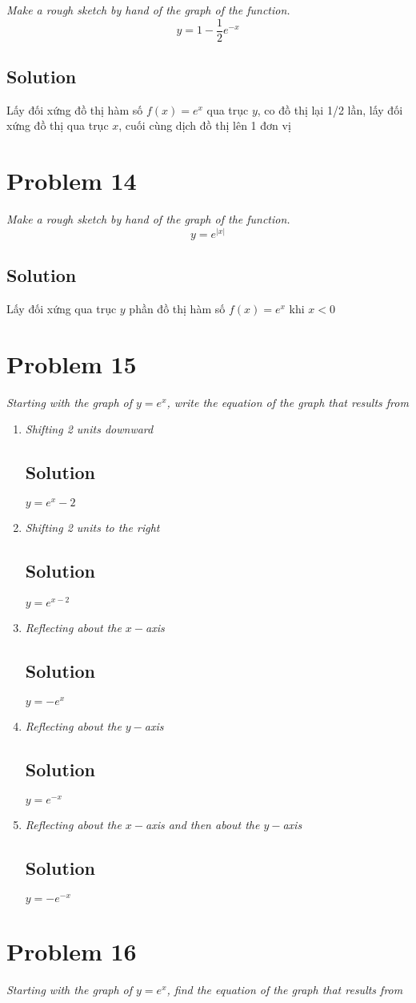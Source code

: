 \documentclass[11pt]{article}
\newcommand{\soln}{\subsection*}
\newcommand{\qn}{\textit}
\begin{document}
\qn{Make a rough sketch by hand of the graph of the function. $$y=1-\frac{1}{2}e^{-x}$$}

\soln{Solution}
Lấy đối xứng đồ thị hàm số $f(x)=e^x$ qua trục $y$, co đồ thị lại 1/2 lần, lấy đối xứng đồ thị qua trục $x$, cuối cùng dịch đồ thị lên 1 đơn vị

\section*{Problem 14}

\qn{Make a rough sketch by hand of the graph of the function. $$y=e^{|x|}$$}

\soln{Solution}
Lấy đối xứng qua trục $y$ phần đồ thị hàm số $f(x)=e^x$ khi $x<0$

\section*{Problem 15}

\qn{Starting with the graph of $y=e^x$, write the equation of the graph that results from}

\begin{enumerate}
	\item \qn{Shifting 2 units downward}
	\soln{Solution}
	$y=e^x-2$
	
	\item \qn{Shifting 2 units to the right}
	\soln{Solution}
	$y=e^{x-2}$
	
	\item \qn{Reflecting about the $x-$axis}
	\soln{Solution}
	$y=-e^x$
	
	\item \qn{Reflecting about the $y-$axis}
	\soln{Solution}
	$y=e^{-x}$
	
	\item \qn{Reflecting about the $x-$axis and then about the $y-$axis}
	\soln{Solution}
	$y=-e^{-x}$
\end{enumerate}

\section*{Problem 16}

\qn{Starting with the graph of $y=e^x$, find the equation of the graph that results from}
\end{document}

